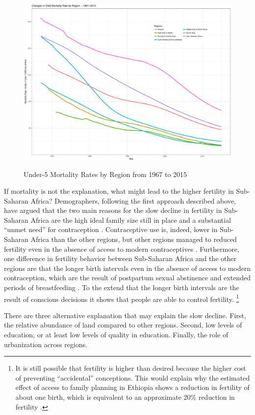 \documentclass[letterpaper,12pt]{article}
\begin{document}
\begin{figure}[hp]
    \centering
    \caption{Under-5 Mortality Rates by Region from 1967 to 2015}
    \includegraphics[width=0.75\linewidth]{childMortalityRates}
    \label{fig:mortality}
\end{figure}

If mortality is not the explanation, what might lead to the
higher fertility in Sub-Saharan Africa?
Demographers, following the first approach described above, 
have argued that the two main reasons for the slow decline 
in fertility in Sub-Saharan Africa are the high ideal family 
size still in place and a substantial ``unmet need'' for contraception  
\citep{Bongaarts2013a,Singh2017}.
Contraceptive use is, indeed, lower in Sub-Saharan Africa than
the other regions, but other regions managed to reduced fertility
even in the absence of access to modern contraceptives 
\citet{Schultz1985,Galloway1987,Bailey1998,bengtsson06}.
Furthermore, one difference in fertility behavior between 
Sub-Saharan Africa and the other regions are that the longer 
birth intervals even in the absence of access to modern 
contraception, which are the result of postpartum sexual 
abstinence and extended periods of breastfeeding \citep{Caldwell1992}.
To the extend that the longer birth intervals are the result
of conscious decisions it shows that people are able to
control fertility.%
\footnote{
It is still possible that fertility is higher than desired
because the higher cost of preventing ``accidental''
conceptions.
This would explain why the estimated effect of access to 
family planning in Ethiopia shows a reduction in fertility
of about one birth, which is equivalent to an approximate
20\% reduction in fertility \citet{Portner2014a}.
}


There are three alternative explanation that may explain the
slow decline.
First, the relative abundance of land compared to other regions.
Second, low levels of education; or at least low levels of quality
in education.
Finally, the role of urbanization across regions.  
\end{document}
